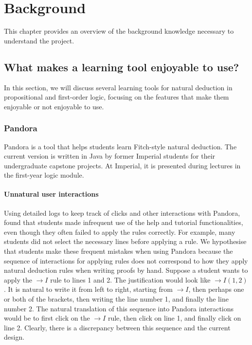 \chapter{Background}\label{background}
This chapter provides an overview of the background knowledge necessary to understand the project.





\section{What makes a learning tool enjoyable to use?}\label{background:enjoyable}
In this section, we will discuss several learning tools for natural deduction in propositional and first-order logic, focusing on the features that make them enjoyable or not enjoyable to use.

\subsection{Pandora}
Pandora \cite{pandora:2007} is a tool that helps students learn Fitch-style natural deduction. The current version \cite{pandora} is written in Java by former Imperial students for their undergraduate capstone projects. At Imperial, it is presented during lectures in the first-year logic module.

\subsubsection{Unnatural user interactions}
Using detailed logs to keep track of clicks and other interactions with Pandora, \cite{pandora:2007} found that students made infrequent use of the help and tutorial functionalities, even though they often failed to apply the rules correctly. For example, many students did not select the necessary lines before applying a rule. We hypothesise that students make these frequent mistakes when using Pandora because the sequence of interactions for applying rules does not correspond to how they apply natural deduction rules when writing proofs by hand. Suppose a student wants to apply the $\rightarrow I$ rule to lines 1 and 2. The justification would look like $\rightarrow I(1, 2)$. It is natural to write it from left to right, starting from $\rightarrow I$, then perhaps one or both of the brackets, then writing the line number 1, and finally the line number 2. The natural translation of this sequence into Pandora interactions would be to first click on the $\rightarrow I$ rule, then click on line 1, and finally click on line 2. Clearly, there is a discrepancy between this sequence and the current design.

